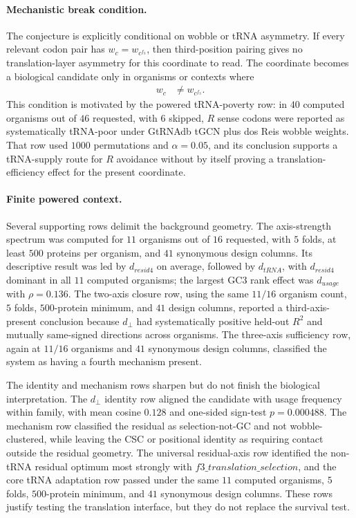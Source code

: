 \paragraph{Mechanistic break condition.}
The conjecture is explicitly conditional on wobble or tRNA asymmetry. If every relevant codon pair has $w_c=w_{c^{f_3}}$, then third-position pairing gives no translation-layer asymmetry for this coordinate to read. The coordinate becomes a biological candidate only in organisms or contexts where
$$
\begin{aligned}
w_c &\neq w_{c^{f_3}}.
\end{aligned}
$$
This condition is motivated by the powered tRNA-poverty row: in $40$ computed organisms out of $46$ requested, with $6$ skipped, $R$ sense codons were reported as systematically tRNA-poor under GtRNAdb tGCN plus dos Reis wobble weights. That row used $1000$ permutations and $\alpha=0.05$, and its conclusion supports a tRNA-supply route for $R$ avoidance without by itself proving a translation-efficiency effect for the present coordinate.

\paragraph{Finite powered context.}
Several supporting rows delimit the background geometry. The axis-strength spectrum was computed for $11$ organisms out of $16$ requested, with $5$ folds, at least $500$ proteins per organism, and $41$ synonymous design columns. Its descriptive result was led by $d_{resid4}$ on average, followed by $d_{tRNA}$, with $d_{resid4}$ dominant in all $11$ computed organisms; the largest GC3 rank effect was $d_{usage}$ with $\rho=0.136$. The two-axis closure row, using the same $11/16$ organism count, $5$ folds, $500$-protein minimum, and $41$ design columns, reported a third-axis-present conclusion because $d_{\perp}$ had systematically positive held-out $R^2$ and mutually same-signed directions across organisms. The three-axis sufficiency row, again at $11/16$ organisms and $41$ synonymous design columns, classified the system as having a fourth mechanism present.

The identity and mechanism rows sharpen but do not finish the biological interpretation. The $d_{\perp}$ identity row aligned the candidate with usage frequency within family, with mean cosine $0.128$ and one-sided sign-test $p=0.000488$. The mechanism row classified the residual as selection-not-GC and not wobble-clustered, while leaving the CSC or positional identity as requiring contact outside the residual geometry. The universal residual-axis row identified the non-tRNA residual optimum most strongly with $f3\_translation\_selection$, and the core tRNA adaptation row passed under the same $11$ computed organisms, $5$ folds, $500$-protein minimum, and $41$ synonymous design columns. These rows justify testing the translation interface, but they do not replace the survival test.

